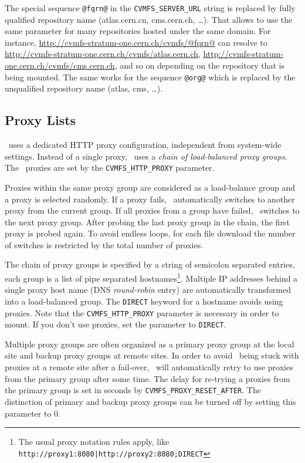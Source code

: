 The special sequence \texttt{@fqrn@} in the \texttt{CVMFS\_SERVER\_URL} string is replaced by fully qualified repository name (\eg atlas.cern.cn, cms.cern.ch, \dots).
That allows to use the same parameter for many repositories hosted under the same domain.
For instance, \url{http://cvmfs-stratum-one.cern.ch/cvmfs/@fqrn@} can resolve to \url{http://cvmfs-stratum-one.cern.ch/cvmfs/atlas.cern.ch}, \url{http://cvmfs-stratum-one.cern.ch/cvmfs/cms.cern.ch}, and so on depending on the repository that is being mounted.
The same works for the sequence \texttt{@org@} which is replaced by the unqualified repository name (\eg atlas, cms, \dots).

\subsection{Proxy Lists}
\cvmfs\ uses a dedicated HTTP proxy configuration, independent from system-wide settings. 
Instead of a single proxy, \cvmfs\ uses a \emph{chain of load-balanced proxy groups}.
The \cvmfs\ proxies are set by the \texttt{CVMFS\_HTTP\_PROXY} parameter.

Proxies within the same proxy group are considered as a load-balance group and a proxy is selected randomly.
If a proxy fails, \cvmfs\ automatically switches to another proxy from the current group.
If all proxies from a group have failed, \cvmfs\ switches to the next proxy group.
After probing the last proxy group in the chain, the first proxy is probed again.
To avoid endless loops, for each file download the number of switches is restricted by the total number of proxies.

The chain of proxy groups is specified by a string of semicolon separated entries, each group is a list of pipe separated hostnames\footnote{The usual proxy notation rules apply, like \texttt{http://proxy1:8080|http://proxy2:8080;DIRECT}}.
Multiple IP addresses behind a single proxy host name (DNS \emph{round-robin} entry) are automatically transformed into a load-balanced group.
The \texttt{DIRECT} keyword for a hostname avoids using proxies.
Note that the \texttt{CVMFS\_HTTP\_PROXY} parameter is necessary in order to mount.
If you don't use proxies, set the parameter to \texttt{DIRECT}.

Multiple proxy groups are often organized as a primary proxy group at the local site and backup proxy groups at remote sites.
In order to avoid \cvmfs\ being stuck with proxies at a remote site after a fail-over, \cvmfs\ will automatically retry to use proxies from the primary group after some time.
The delay for re-trying a proxies from the primary group is set in seconds by \texttt{CVMFS\_PROXY\_RESET\_AFTER}.
The distinction of primary and backup proxy groups can be turned off by setting this parameter to 0.

